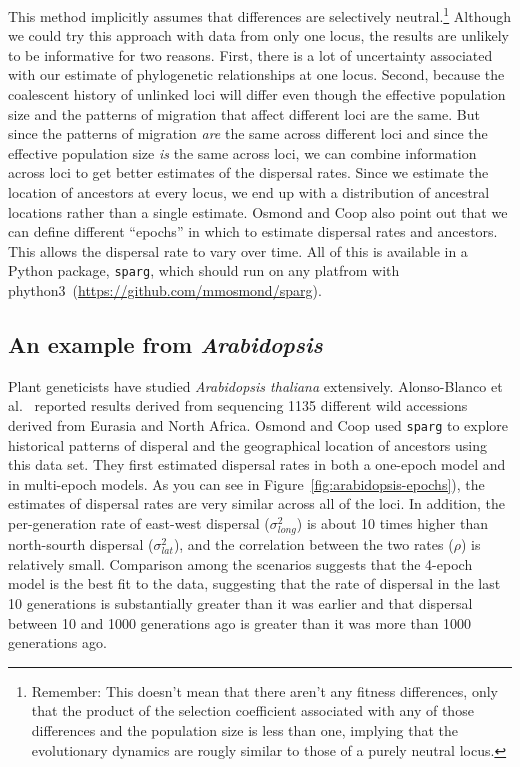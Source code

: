 \documentclass[12pt]{article}
\begin{document}
This method implicitly assumes that differences are selectively
neutral.\footnote{Remember: This doesn't mean that there aren't any
  fitness differences, only that the product of the selection
  coefficient associated with any of those differences and the
  population size is less than one, implying that the evolutionary
  dynamics are rougly similar to those of a purely neutral locus.}
Although we could try this approach with data from only one locus, the
results are unlikely to be informative for two reasons. First, there
is a lot of uncertainty associated with our estimate of phylogenetic
relationships at one locus. Second, because the coalescent history of
unlinked loci will differ even though the effective population size
and the patterns of migration that affect different loci are the
same. But since the patterns of migration {\it are\/} the same across
different loci and since the effective population size {\it is\/} the
same across loci, we can combine information across loci to get better
estimates of the dispersal rates. Since we estimate the location of
ancestors at every locus, we end up with a distribution of ancestral
locations rather than a single estimate. Osmond and Coop also point
out that we can define different ``epochs'' in which to estimate
dispersal rates and ancestors. This allows the dispersal rate to vary
over time. All of this is available in a Python package, {\tt sparg},
which should run on any platfrom with
phython3~(\url{https://github.com/mmosmond/sparg}).

\subsection*{An example from {\it Arabidopsis}} 

Plant geneticists have studied {\it Arabidopsis thaliana\/}
extensively. Alonso-Blanco et al.~\cite{AlonsoBlanco-etal-2016}
reported results derived from sequencing 1135 different wild
accessions derived from Eurasia and North Africa. Osmond and Coop used
{\tt sparg} to explore historical patterns of disperal and the
geographical location of ancestors using this data set. They first
estimated dispersal rates in both a one-epoch model and in multi-epoch
models. As you can see in Figure~\ref{fig:arabidopsis-epochs}), the
estimates of dispersal rates are very similar across all of the
loci. In addition, the per-generation rate of east-west dispersal
($\sigma^2_{long}$) is about 10 times higher than north-sourth
dispersal ($\sigma^2_{lat}$), and the correlation between the two
rates ($\rho$) is relatively small. Comparison among the scenarios
suggests that the 4-epoch model is the best fit to the data,
suggesting that the rate of dispersal in the last 10 generations is
substantially greater than it was earlier and that dispersal between
10 and 1000 generations ago is greater than it was more than 1000
generations ago.
\end{document}
